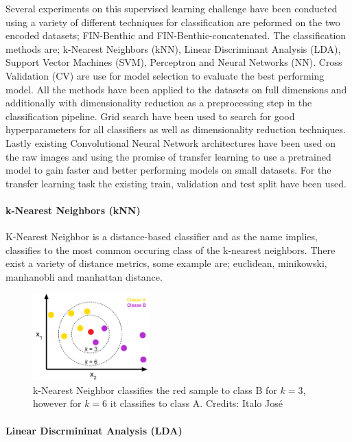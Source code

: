 Several experiments on this supervised learning challenge have been conducted using a variety of different techniques for classification are peformed on the two encoded datasets; FIN-Benthic and FIN-Benthic-concatenated. The classification methods are; k-Nearest Neighbors (kNN), Linear Discriminant Analysis (LDA), Support Vector Machines (SVM), Perceptron and Neural Networks (NN). Cross Validation (CV) are use for model selection to evaluate the best performing model. All the methods have been applied to the datasets on full dimensions and additionally with dimensionality reduction as a preprocessing step in the classification pipeline. Grid search have been used to search for good hyperparameters for all classifiers as well as dimensionality reduction techniques. Lastly existing Convolutional Neural Network architectures have been used on the raw images and using the promise of transfer learning to use a pretrained model to gain faster and better performing models on small datasets. For the transfer learning task the existing train, validation and test split have been used.

\paragraph{k-Nearest Neighbors (kNN)}

K-Nearest Neighbor is a distance-based classifier and as the name implies, classifies to the most common occuring class of the k-nearest neighbors. There exist a variety of distance metrics, some example are; euclidean, minikowski, manhanobli and manhattan distance. 

\begin{figure}[H]
    \centering
    \includegraphics[width=0.4\textwidth]{figures/knn.png}
    \caption[]{k-Nearest Neighbor classifies the red sample to class B for $k=3$, however for $k=6$ it classifies to class A. Credits: Italo José}
    \label{fig:knn}
\end{figure}

\paragraph{Linear Discrmininat Analysis (LDA)}

